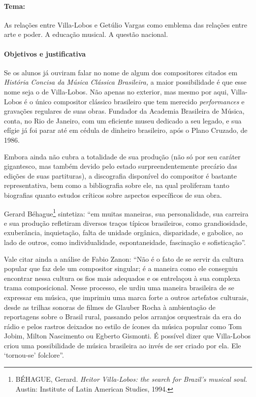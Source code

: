 \documentclass[11pt]{extarticle}
\begin{document}
\paragraph{Tema:} As relações entre Villa-Lobos e Getúlio Vargas como
emblema das relações entre arte e poder. A educação musical. A questão
nacional.



\paragraph{Objetivos e justificativa }

Se os alunos já ouviram falar no nome de algum dos compositores citados
em \emph{História Concisa da Música Clássica Brasileira,} a maior
possibilidade é que esse nome seja o de Villa-Lobos\emph{.} Não apenas
no exterior, mas mesmo por aqui, Villa-Lobos é o único compositor
clássico brasileiro que tem merecido \emph{performances} e gravações
regulares de suas obras. Fundador da Academia Brasileira de Música,
conta, no Rio de Janeiro, com um eficiente museu dedicado a seu legado,
e sua efígie já foi parar até em cédula de dinheiro brasileiro, após o
Plano Cruzado, de 1986.


Embora ainda não cubra a totalidade de sua produção (não só por seu
caráter gigantesco, mas também devido pelo estado surpreendentemente
precário das edições de suas partituras), a discografia disponível do
compositor é bastante representativa, bem como a bibliografia sobre ele,
na qual proliferam tanto biografias quanto estudos críticos sobre
aspectos específicos de sua obra.

Gerard Béhague\footnote{BÉHAGUE, Gerard. \emph{Heitor Villa-Lobos: the
  search for Brazil's musical soul.} Austin: Institute of Latin American
  Studies, 1994.} sintetiza: ``em muitas maneiras, sua personalidade,
sua carreira e sua produção refletiram diversos traços típicos
brasileiros, como grandiosidade, exuberância, inquietação, falta de
unidade orgânica, disparidade, e gabolice, ao lado de outros, como
individualidade, espontaneidade, fascinação e sofisticação''.

Vale citar ainda a análise de Fabio Zanon: ``Não é o fato de se servir
da cultura popular que faz dele um compositor singular; é a maneira como
ele conseguiu encontrar nessa cultura os fios mais adequados e os
entrelaçou à sua complexa trama composicional. Nesse processo, ele urdiu
uma maneira brasileira de se expressar em música, que imprimiu uma marca
forte a outros artefatos culturais, desde as trilhas sonoras de filmes
de Glauber Rocha à ambientação de reportagens sobre o Brasil rural,
passando pelos arranjos orquestrais da era do rádio e pelos rastros
deixados no estilo de ícones da música popular como Tom Jobim, Milton
Nascimento ou Egberto Gismonti. É possível dizer que Villa-Lobos criou
uma possibilidade de música brasileira ao invés de ser criado por ela.
Ele `tornou-se' folclore''.
\end{document}
